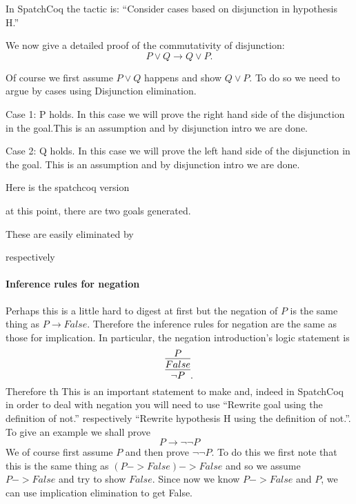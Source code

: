 \begin{itemize}
In SpatchCoq the tactic is: ``Consider cases based on disjunction in hypothesis H.''

We now give a detailed proof of the commutativity of disjunction:
$$P\lor Q \rightarrow Q\lor P.$$ 

Of course we first assume $P\lor Q$ happens and show $Q \lor P$. To do so we need to argue by cases using Disjunction elimination.

Case 1: P holds. In this case we will prove the right hand side of the disjunction in the goal.This is an assumption and by disjunction intro we are done.

Case 2: Q holds. In this case we will prove the left hand side of the disjunction in the goal. This is an assumption  and by disjunction intro we are done.

Here is the spatchcoq version


at this point, there are two goals generated.


These are easily eliminated by

respectively 



\paragraph{Inference rules for negation}

Perhaps this is a little hard to digest at first but the negation of $P$ is the same thing as $P\rightarrow False$. Therefore the inference rules for negation are the same as those for implication. In particular, the negation introduction's logic statement is
$$\infer{\neg P}{\infer{False}{P}}.$$
Therefore th This is an important statement to make and, indeed in SpatchCoq in order to deal with negation you will need to use ``Rewrite goal using the definition of not.'' respectively ``Rewrite hypothesis	H using the definition of not.''. To give an example we shall prove 
$$P \rightarrow \neg \neg P$$
We of course first assume $P$ and then prove $\neg \neg P$. To do this we first note that this is the same thing as $(P->False)->False$ and so we assume $P->False$ and try to show $False$. Since now we know $P->False$ and $P$, we can use implication elimination to get False.





\end{itemize}
